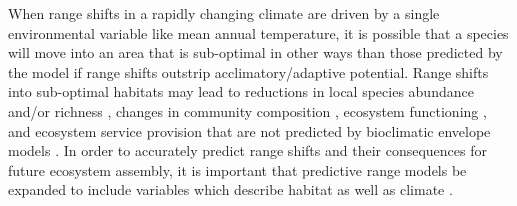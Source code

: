 \documentclass[a4paper, 11pt]{article}
\begin{document}
When range shifts in a rapidly changing climate are driven by a single environmental variable like mean annual temperature, it is possible that a species will move into an area that is sub-optimal in other ways than those predicted by the model if range shifts outstrip acclimatory/adaptive potential. Range shifts into sub-optimal habitats may lead to reductions in local species abundance and/or richness \citep{Colwell2008}, changes in community composition \citep{Gibson-Reinemer2015}, ecosystem functioning \citep{Bellard2012}, and ecosystem service provision that are not predicted by bioclimatic envelope models \citep{Dobson2011, Isbell2011}. In order to accurately predict range shifts and their consequences for future ecosystem assembly, it is important that predictive range models be expanded to include variables which describe habitat as well as climate \citep{Wisz2013}.
\end{document}

